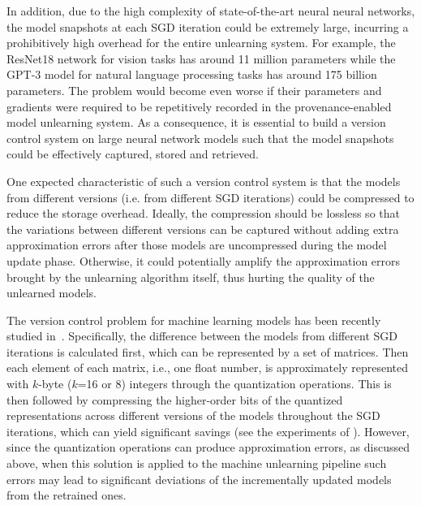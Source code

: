 \documentclass[11pt]{article}
\begin{document}
In addition, due to the high complexity of  state-of-the-art neural neural networks, the model snapshots at each SGD iteration could be extremely large, incurring a prohibitively high overhead for the entire unlearning system. For example, the ResNet18 network for vision tasks has around 11 million parameters \cite{he2016deep} while the GPT-3 model \cite{brown2020language} for natural language processing tasks has around 175 billion parameters. The problem would become even worse if their parameters and gradients were required to be repetitively recorded in the provenance-enabled model unlearning system. As a consequence, it is essential to build a version control system on large neural network models such that the model snapshots could be effectively captured, stored and retrieved. 

One expected characteristic of such a version control system is that the models from different versions (i.e. from different SGD iterations) could be compressed to reduce the storage overhead. Ideally, the compression should be lossless so that the variations between different versions can be captured without adding extra approximation errors after those models are uncompressed during the model update phase. Otherwise, it could potentially amplify the approximation errors brought by the unlearning algorithm itself, thus hurting the quality of the unlearned models. 

The version control problem for machine learning models has been recently studied in~\cite{miao2017towards}. Specifically, the difference between the models from different SGD iterations is calculated first, which can be represented by a set of matrices. Then each element of each matrix, i.e., one float number, is approximately represented with $k$-byte ($k$=16 or 8) integers through the quantization operations. 
This is then followed by compressing the higher-order bits of the quantized representations across different versions of the models throughout the SGD iterations, which can %
yield significant savings (see the experiments of \cite{miao2017towards}). However, since the quantization operations can produce approximation errors, as discussed above, when this solution is applied to the machine unlearning pipeline such errors may lead to significant deviations of the incrementally updated models from the retrained ones.
\end{document}
